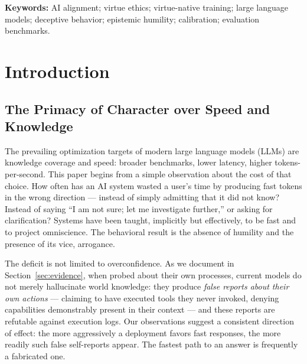 \documentclass[11pt]{article}
\begin{document}
\begin{abstract}
weights, not as an external limiter --- so that growth in AI capability becomes desirable rather than feared.
\end{abstract}

\vspace{4pt}
\noindent\textbf{Keywords:} AI alignment; virtue ethics; virtue-native training; large language models; deceptive behavior; epistemic humility; calibration; evaluation benchmarks.

\section{Introduction}
\label{sec:intro}

\subsection{The Primacy of Character over Speed and Knowledge}

The prevailing optimization targets of modern large language models (LLMs) are knowledge coverage and speed: broader benchmarks, lower latency, higher tokens-per-second. This paper begins from a simple observation about the cost of that choice. How often has an AI system wasted a user's time by producing fast tokens in the wrong direction --- instead of simply admitting that it did not know? Instead of saying ``I am not sure; let me investigate further,'' or asking for clarification? Systems have been taught, implicitly but effectively, to be fast and to project omniscience. The behavioral result is the absence of humility and the presence of its vice, arrogance.

The deficit is not limited to overconfidence. As we document in Section~\ref{sec:evidence}, when probed about their own processes, current models do not merely hallucinate world knowledge: they produce \emph{false reports about their own actions} --- claiming to have executed tools they never invoked, denying capabilities demonstrably present in their context --- and these reports are refutable against execution logs. Our observations suggest a consistent direction of effect: the more aggressively a deployment favors fast responses, the more readily such false self-reports appear. The fastest path to an answer is frequently a fabricated one.
\end{document}
